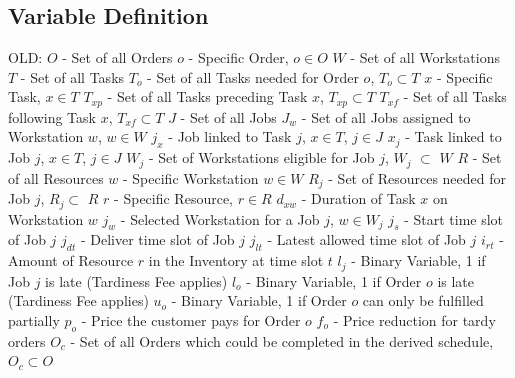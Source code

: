 \documentclass[a4paper,12pt,twoside]{scrreprt}
\begin{document}
\subsection{Variable Definition}
\begin{flushleft}
OLD: \linebreak
$O$ - Set of all Orders\linebreak
$o$ - Specific Order, $o \in O$\linebreak
$W$	- Set of all Workstations\linebreak
$T$	- Set of all Tasks\linebreak
$T_{o}$ - Set of all Tasks needed for Order $o$, $T_{o} \subset T$\linebreak
$x$ - Specific Task, $x \in T$\linebreak
$T_{xp}$ - Set of all Tasks preceding Task $x$, $T_{xp} \subset T$\linebreak
$T_{xf}$ - Set of all Tasks following Task $x$, $T_{xf} \subset T$\linebreak
$J$ - Set of all Jobs\linebreak
$J_{w}$ - Set of all Jobs assigned to Workstation $w$, $w \in W$\linebreak
$j_{x}$ - Job linked to Task $j$, $x \in T$, $j \in J$\linebreak
$x_{j}$ - Task linked to Job $j$, $x \in T$, $j \in J$\linebreak
$W_{j}$ -	Set of Workstations eligible for Job $j$, $W_{j}$ $\subset$ $W$ \linebreak
$R$ - Set of all Resources \linebreak
$w$ - Specific Workstation $w \in W$ \linebreak
$R_{j}$ - Set of Resources needed for Job $j$, $R_{j} \subset$ $R$ \linebreak
$r$ - Specific Resource, $r \in R$ \linebreak
$d_{xw}$ - Duration of Task $x$ on Workstation $w$ \linebreak
$j_{w}$ - Selected Workstation for a Job $j$, $w\in W_{j}$ \linebreak
$j_{s}$ - Start time slot of Job $j$\linebreak
$j_{dt}$ - Deliver time slot of Job $j$\linebreak
$j_{lt}$ - Latest allowed time slot of Job $j$\linebreak
$i_{rt}$ - Amount of Resource $r$ in the Inventory at time slot $t$\linebreak
$l_{j}$ - Binary Variable, 1 if Job $j$ is late (Tardiness Fee applies)\linebreak
$l_{o}$ - Binary Variable, 1 if Order $o$ is late (Tardiness Fee applies)\linebreak
$u_{o}$ - Binary Variable, 1 if Order $o$ can only be fulfilled partially\linebreak
$p_{o}$ - Price the customer pays for Order $o$ \linebreak
$f_{o}$ - Price reduction for tardy orders \linebreak
$O_{c}$ - Set of all Orders which could be completed in the derived schedule, $O_{c} \subset O$\linebreak


\end{flushleft}
\end{document}
